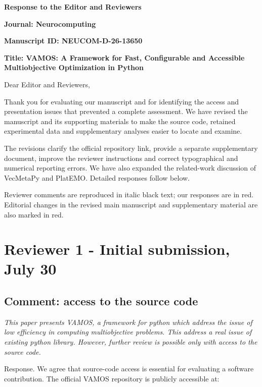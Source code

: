 \documentclass[11pt,letterpaper]{article}
\newcommand{\response}[1]{{\color{response}#1}\par}
\newcommand{\reviewercomment}[1]{{\itshape #1}\par}
\begin{document}
{\Large\bfseries Response to the Editor and Reviewers}\par

\textbf{Journal: Neurocomputing}\par

\textbf{Manuscript ID: NEUCOM-D-26-13650}\par

\textbf{Title: VAMOS: A Framework for Fast, Configurable and Accessible Multiobjective Optimization in Python}\par

Dear Editor and Reviewers,\par

\response{Thank you for evaluating our manuscript and for identifying the access and presentation issues that prevented a complete assessment. We have revised the manuscript and its supporting materials to make the source code, retained experimental data and supplementary analyses easier to locate and examine.}

\response{The revisions clarify the official repository link, provide a separate supplementary document, improve the reviewer instructions and correct typographical and numerical reporting errors. We have also expanded the related-work discussion of VecMetaPy and PlatEMO. Detailed responses follow below.}

Reviewer comments are reproduced in italic black text; our responses are in red. Editorial changes in the revised main manuscript and supplementary material are also marked in red.\par

\section*{Reviewer 1 - Initial submission, July 30}

\subsection*{Comment: access to the source code}

\reviewercomment{This paper presents VAMOS, a framework for python which address the issue of low efficiency in computing multiobjective problems. This address a real issue of existing python library. However, further review is possible only with access to the source code.}

\response{Response. We agree that source-code access is essential for evaluating a software contribution. The official VAMOS repository is publicly accessible at:}
\end{document}
